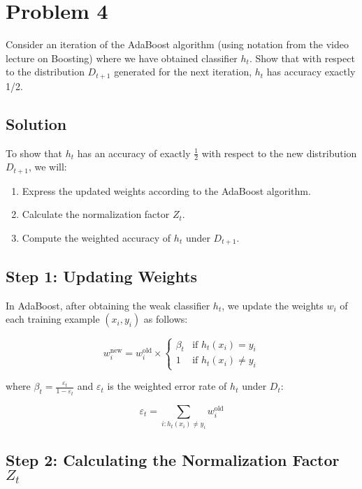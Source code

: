 \documentclass{article}
\begin{document}
\section*{Problem 4}

\textbf{} Consider an iteration of the AdaBoost algorithm (using notation from the video lecture on Boosting) where we have obtained classifier $h_t$. Show that with respect to the distribution $D_{t+1}$ generated for the next iteration, $h_t$ has accuracy exactly 1/2.

\subsection*{Solution}

To show that $h_t$ has an accuracy of exactly $\frac{1}{2}$ with respect to the new distribution $D_{t+1}$, we will:

\begin{enumerate}
    \item Express the updated weights according to the AdaBoost algorithm.
    \item Calculate the normalization factor $Z_t$.
    \item Compute the weighted accuracy of $h_t$ under $D_{t+1}$.
\end{enumerate}

\subsection*{Step 1: Updating Weights}

In AdaBoost, after obtaining the weak classifier $h_t$, we update the weights $w_i$ of each training example $(x_i, y_i)$ as follows:

\[
w_i^{\text{new}} = w_i^{\text{old}} \times \begin{cases}
\beta_t & \text{if } h_t(x_i) = y_i \\
1 & \text{if } h_t(x_i) \neq y_i
\end{cases}
\]

where $\beta_t = \frac{\varepsilon_t}{1 - \varepsilon_t}$ and $\varepsilon_t$ is the weighted error rate of $h_t$ under $D_t$:

\[
\varepsilon_t = \sum_{i: h_t(x_i) \neq y_i} w_i^{\text{old}}
\]

\subsection*{Step 2: Calculating the Normalization Factor $Z_t$}
\end{document}
